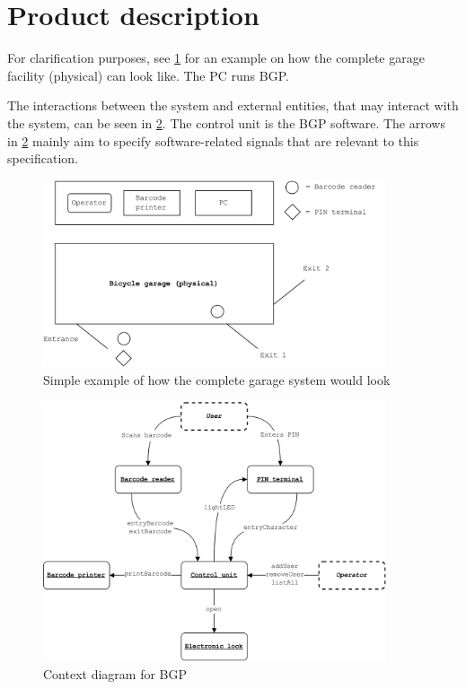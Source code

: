 \documentclass[12pt,titlepage,bibliography=totoc]{article}
\begin{document}
\section{Product description}
\label{sec:proddesc}

For clarification purposes, see \cref{fig:garage} for an example on how the complete garage facility (physical) can look like. The PC runs BGP.

The interactions between the system and external entities, that may interact with the system, can be seen in \cref{fig:context-hw}. The control unit is the BGP software. The arrows in \cref{fig:context-hw} mainly aim to specify software-related signals that are relevant to this specification.

\begin{figure}
	\centering
	\includegraphics[width=0.9\textwidth]{./assets/garage.png}
	\caption{Simple example of how the complete garage system would look}
	\label{fig:garage}
\end{figure}

\begin{figure}
	\centering
	\includegraphics[width=0.9\textwidth]{./assets/context-hw-nobox.png}
	\caption{Context diagram for BGP}
	\label{fig:context-hw}
\end{figure}
\end{document}
